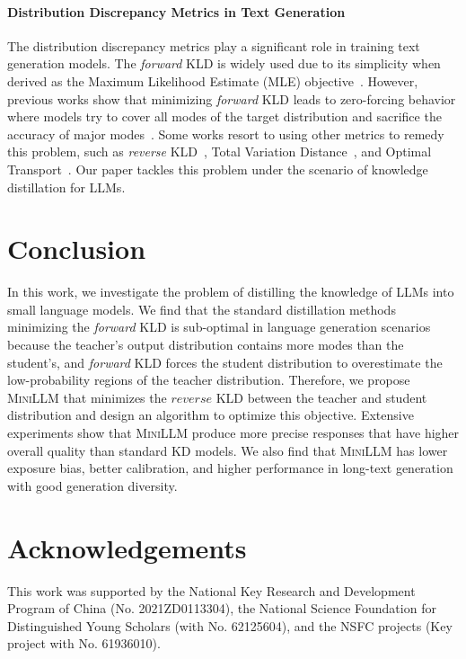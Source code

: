 \documentclass{article}
\begin{document}
\paragraph{Distribution Discrepancy Metrics in Text Generation} The distribution discrepancy metrics play a significant role in training text generation models. The \textit{forward} KLD is widely used due to its simplicity when derived as the Maximum Likelihood Estimate (MLE) objective~\citep{zhang2018minimum}. However, previous works show that minimizing \textit{forward} KLD leads to zero-forcing behavior where models try to cover all modes of the target distribution and sacrifice the accuracy of major modes~\citep{huszar2015not}. Some works resort to using other metrics to remedy this problem, such as \textit{reverse} KLD~\citep{smart}, Total Variation Distance~\citep{tailor}, and Optimal Transport~\citep{ot_for_gen}. Our paper tackles this problem under the scenario of knowledge distillation for LLMs.

\section{Conclusion}

In this work, we investigate the problem of distilling the knowledge of LLMs into small language models. We find that the standard distillation methods minimizing the \textit{forward} KLD is sub-optimal in language generation scenarios because the teacher's output distribution contains more modes than the student's, and \textit{forward} KLD forces the student distribution to overestimate the low-probability regions of the teacher distribution. Therefore, we propose \textsc{MiniLLM} that minimizes the $\textit{reverse}$ KLD between the teacher and student distribution and design an algorithm to optimize this objective. Extensive experiments show that \textsc{MiniLLM} produce more precise responses that have higher overall quality than standard KD models. We also find that \textsc{MiniLLM} has lower exposure bias, better calibration, and higher performance in long-text generation with good generation diversity. 

\section*{Acknowledgements}
This work was supported by the National Key Research and Development Program of China (No. 2021ZD0113304), the National Science Foundation for Distinguished Young Scholars (with No. 62125604), and the NSFC projects (Key project with No. 61936010). 
\end{document}
